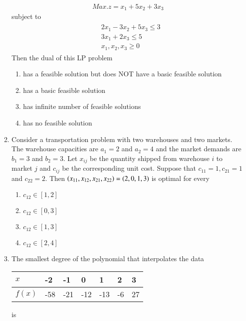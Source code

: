 \documentclass[journal]{IEEEtran}
\begin{document}
\begin{enumerate}
		\begin{align*}
		Max. z=x_{1}+5 x_{2}+3 x_{3}
		\end{align*}
subject to
             \begin{align*}
		\begin{aligned}
& 2 x_{1}-3 x_{2}+5 x_{3} \leq 3 \\
& 3 x_{1}+2 x_{3} \leq 5 \\
& x_{1}, x_{2}, x_{3} \geq 0
\end{aligned}
             \end{align*}
	 Then the dual of this LP problem
		\begin{enumerate}
			\item has a feasible solution but does NOT have a basic feasible solution
			\item has a basic feasible solution
			\item has infinite number of feasible solutions
			\item has no feasible solution
        	\end{enumerate}
	\item Consider a transportation problem with two warehouses and two markets. The warehouse capacities are $a_{1}=2$ and $a_{2}=4$ and the market demands are $b_{1}=3$ and $b_{2}=3$. Let $x_{i j}$ be the quantity shipped from warehouse $i$ to market $j$ and $c_{i j}$ be the corresponding unit cost. Suppose that $c_{11}=1, c_{21}=1$ and $c_{22}=2$. Then $\left(x_{11}, x_{12}, x_{21}, x_{22}\right)=(2,0,1,3)$ is optimal for every
		\begin{enumerate}
			\item $c_{12} \in[1,2]$
			\item $c_{12} \in[0,3]$
	         	\item $c_{12} \in[1,3]$
                 	\item $c_{12} \in[2,4]$
	\end{enumerate}	
    \item The smallest degree of the polynomial that interpolates the data
     \begin{tabular}{|l|l|l|l|l|l|l|}
     \hline$x$ & -2 & -1 & 0 & 1 & 2 & 3 \\
     \hline$f(x)$ & -58 & -21 & -12 & -13 & -6 & 27 \\
     \hline
\end{tabular}
is
      \begin{enumerate}
\end{enumerate}
\end{enumerate}
\end{document}
